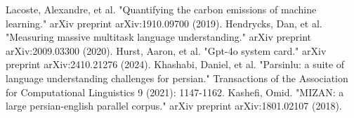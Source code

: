 \documentclass[conference]{IEEEtran}
\begin{document}
\begin{thebibliography}{00}
		Lacoste, Alexandre, et al. "Quantifying the carbon emissions of machine learning." arXiv preprint arXiv:1910.09700 (2019).
		Hendrycks, Dan, et al. "Measuring massive multitask language understanding." arXiv preprint arXiv:2009.03300 (2020).
		Hurst, Aaron, et al. "Gpt-4o system card." arXiv preprint arXiv:2410.21276 (2024).
		Khashabi, Daniel, et al. "Parsinlu: a suite of language understanding challenges for persian." Transactions of the Association for Computational Linguistics 9 (2021): 1147-1162.
		Kashefi, Omid. "MIZAN: a large persian-english parallel corpus." arXiv preprint arXiv:1801.02107 (2018).
	\end{thebibliography}
	
	
\end{document}
